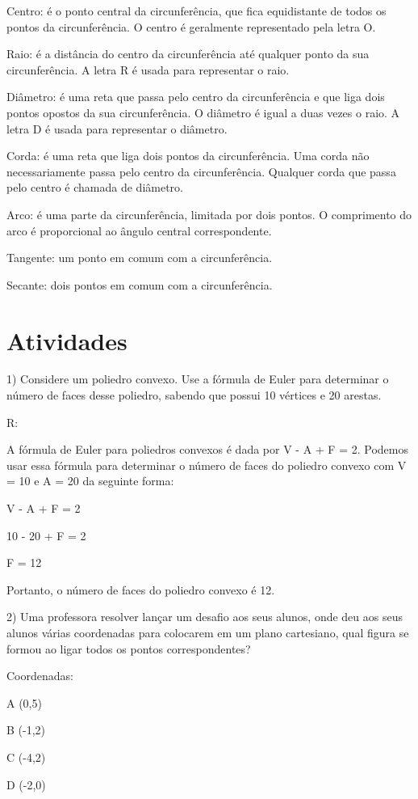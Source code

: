 Centro: é o ponto central da circunferência, que fica equidistante de
todos os pontos da circunferência. O centro é geralmente representado
pela letra O.

Raio: é a distância do centro da circunferência até qualquer ponto da
sua circunferência. A letra R é usada para representar o raio.

Diâmetro: é uma reta que passa pelo centro da circunferência e que liga
dois pontos opostos da sua circunferência. O diâmetro é igual a duas
vezes o raio. A letra D é usada para representar o diâmetro.

Corda: é uma reta que liga dois pontos da circunferência. Uma corda não
necessariamente passa pelo centro da circunferência. Qualquer corda que
passa pelo centro é chamada de diâmetro.

Arco: é uma parte da circunferência, limitada por dois pontos. O
comprimento do arco é proporcional ao ângulo central correspondente.

Tangente: um ponto em comum com a circunferência.

Secante: dois pontos em comum com a circunferência.

\section{Atividades}

1) Considere um poliedro convexo. Use a fórmula de Euler para determinar
o número de faces desse poliedro, sabendo que possui 10 vértices e 20
arestas.

R:

A fórmula de Euler para poliedros convexos é dada por V - A + F = 2.
Podemos usar essa fórmula para determinar o número de faces do poliedro
convexo com V = 10 e A = 20 da seguinte forma:

V - A + F = 2

10 - 20 + F = 2

F = 12

Portanto, o número de faces do poliedro convexo é 12.

2) Uma professora resolver lançar um desafio aos seus alunos, onde deu
aos seus alunos várias coordenadas para colocarem em um plano
cartesiano, qual figura se formou ao ligar todos os pontos
correspondentes?

Coordenadas:

A (0,5)

B (-1,2)

C (-4,2)

D (-2,0)

